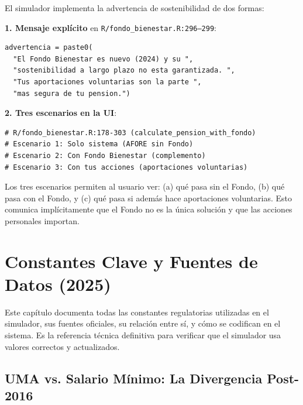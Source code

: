\documentclass[11pt,a4paper]{report}
\begin{document}
\begin{tcolorbox}[colback=orange!5!white, colframe=orange!75!black, title=\textbf{Aplicaci\'on en C\'odigo}]
El simulador implementa la advertencia de sostenibilidad de dos formas:

\textbf{1. Mensaje expl\'icito} en \texttt{R/fondo\_bienestar.R:296--299}:
\begin{lstlisting}
advertencia = paste0(
  "El Fondo Bienestar es nuevo (2024) y su ",
  "sostenibilidad a largo plazo no esta garantizada. ",
  "Tus aportaciones voluntarias son la parte ",
  "mas segura de tu pension.")
\end{lstlisting}

\textbf{2. Tres escenarios en la UI}:
\begin{lstlisting}
# R/fondo_bienestar.R:178-303 (calculate_pension_with_fondo)
# Escenario 1: Solo sistema (AFORE sin Fondo)
# Escenario 2: Con Fondo Bienestar (complemento)
# Escenario 3: Con tus acciones (aportaciones voluntarias)
\end{lstlisting}

Los tres escenarios permiten al usuario ver: (a) qu\'e pasa sin el Fondo, (b) qu\'e pasa con el Fondo, y (c) qu\'e pasa si adem\'as hace aportaciones voluntarias. Esto comunica impl\'icitamente que el Fondo no es la \'unica soluci\'on y que las acciones personales importan.
\end{tcolorbox}

\chapter{Constantes Clave y Fuentes de Datos (2025)}

Este cap\'itulo documenta todas las constantes regulatorias utilizadas en el simulador, sus fuentes oficiales, su relaci\'on entre s\'i, y c\'omo se codifican en el sistema. Es la referencia t\'ecnica definitiva para verificar que el simulador usa valores correctos y actualizados.

\section{UMA vs. Salario M\'inimo: La Divergencia Post-2016}
\end{document}
